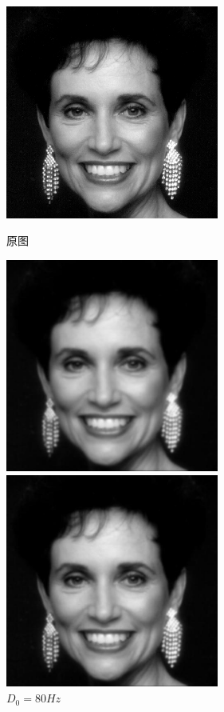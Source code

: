 \documentclass[11pt, a4paper, UTF8]{ctexart}
\begin{document}
    \begin{figure}[H]
      \centering
      \begin{minipage}[t]{0.48\textwidth}
      \centering
      \includegraphics[width=7cm]{woman.png}
      \caption{原图}
      \end{minipage}
      \begin{minipage}[t]{0.48\textwidth}
      \centering
      \includegraphics[width=7cm]{Gaus_80Hz.jpg}
      \caption{$D_0 =80Hz$}
      \end{minipage}
      \begin{minipage}[t]{0.48\textwidth}
        \centering
        \includegraphics[width=7cm]{Gaus_100Hz.jpg}

\end{minipage}
\end{figure}
\end{document}
